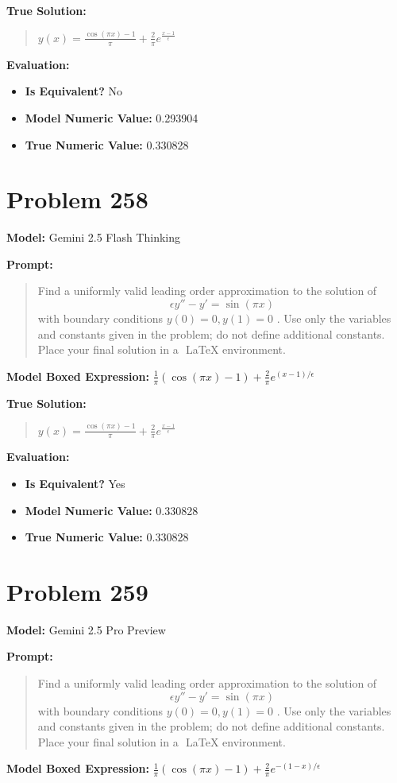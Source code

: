 \documentclass{article}
\begin{document}
{\textbf{True Solution:}
\begin{quote}
$y(x) = \frac{\cos(\pi x) - 1}{\pi} + \frac{2}{\pi}e^{\frac{x-1}{\epsilon}}$
\end{quote}

\textbf{Evaluation:}
\begin{itemize}
\item \textbf{Is Equivalent?} No
\item \textbf{Model Numeric Value:} 0.293904
\item \textbf{True Numeric Value:} 0.330828
\end{itemize}
\vspace{1cm}
\section*{Problem 258}
\textbf{Model:} Gemini 2.5 Flash Thinking

\textbf{Prompt:}
\begin{quote}
Find a uniformly valid leading order approximation to the solution of $$\epsilon y'' - y' = \sin(\pi x)$$ with boundary conditions $ y(0) = 0, y(1) = 0$ . Use only the variables and constants given in the problem; do not define additional constants. Place your final solution in a $\boxed{}$ LaTeX environment.
\end{quote}
\textbf{Model Boxed Expression:} $\frac{1}{\pi}(\cos(\pi x)-1) + \frac{2}{\pi}e^{(x-1)/\epsilon}$

\textbf{True Solution:}
\begin{quote}
$y(x) = \frac{\cos(\pi x) - 1}{\pi} + \frac{2}{\pi}e^{\frac{x-1}{\epsilon}}$
\end{quote}

\textbf{Evaluation:}
\begin{itemize}
\item \textbf{Is Equivalent?} Yes
\item \textbf{Model Numeric Value:} 0.330828
\item \textbf{True Numeric Value:} 0.330828
\end{itemize}
\vspace{1cm}
\section*{Problem 259}
\textbf{Model:} Gemini 2.5 Pro Preview

\textbf{Prompt:}
\begin{quote}
Find a uniformly valid leading order approximation to the solution of $$\epsilon y'' - y' = \sin(\pi x)$$ with boundary conditions $ y(0) = 0, y(1) = 0$ . Use only the variables and constants given in the problem; do not define additional constants. Place your final solution in a $\boxed{}$ LaTeX environment.
\end{quote}
\textbf{Model Boxed Expression:} $\frac{1}{\pi}\left(\cos(\pi x)-1\right) + \frac{2}{\pi}e^{-(1-x)/\epsilon}$

}
\end{document}
